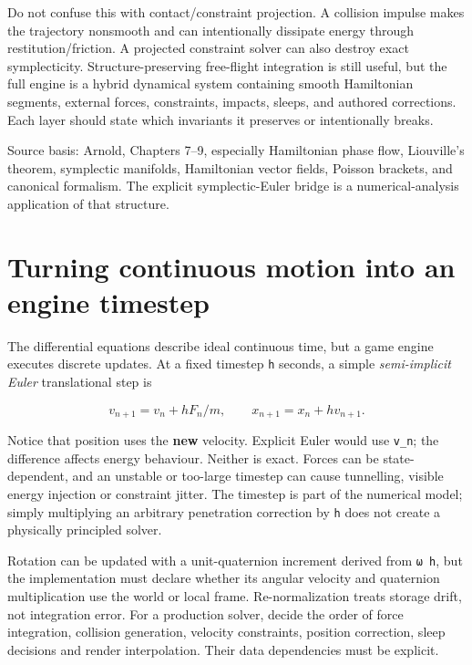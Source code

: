 Do not confuse this with contact/constraint projection. A collision impulse makes the trajectory nonsmooth and can intentionally dissipate energy through restitution/friction. A projected constraint solver can also destroy exact symplecticity. Structure-preserving free-flight integration is still useful, but the full engine is a hybrid dynamical system containing smooth Hamiltonian segments, external forces, constraints, impacts, sleeps, and authored corrections. Each layer should state which invariants it preserves or intentionally breaks.

Source basis: Arnold, Chapters 7--9, especially Hamiltonian phase flow, Liouville's theorem, symplectic manifolds, Hamiltonian vector fields, Poisson brackets, and canonical formalism. The explicit symplectic-Euler bridge is a numerical-analysis application of that structure.

\section{Turning continuous motion into an engine timestep}\label{06-engine-ii-ch033-turning-continuous-motion-into-an-engine-timestep}

The differential equations describe ideal continuous time, but a game engine executes discrete updates. At a fixed timestep \texttt{h} seconds, a simple \emph{semi-implicit Euler} translational step is

\[
v_{n+1}=v_n+h F_n/m,\qquad x_{n+1}=x_n+h v_{n+1}.
\]

Notice that position uses the \textbf{new} velocity. Explicit Euler would use \texttt{v\_n}; the difference affects energy behaviour. Neither is exact. Forces can be state-dependent, and an unstable or too-large timestep can cause tunnelling, visible energy injection or constraint jitter. The timestep is part of the numerical model; simply multiplying an arbitrary penetration correction by \texttt{h} does not create a physically principled solver.

Rotation can be updated with a unit-quaternion increment derived from \texttt{ω\ h}, but the implementation must declare whether its angular velocity and quaternion multiplication use the world or local frame. Re-normalization treats storage drift, not integration error. For a production solver, decide the order of force integration, collision generation, velocity constraints, position correction, sleep decisions and render interpolation. Their data dependencies must be explicit.

